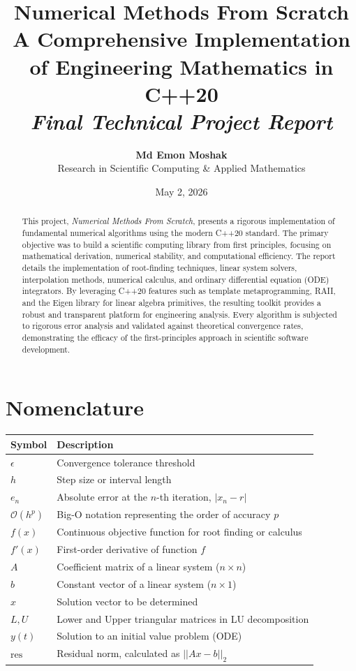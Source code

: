 \documentclass[11pt,a4paper]{article}
\title{
    \vspace{2cm}
    \textbf{\huge Numerical Methods From Scratch} \\
    \vspace{0.5cm}
    \Large A Comprehensive Implementation of Engineering Mathematics in C++20 \\
    \vspace{1cm}
    \large \textit{Final Technical Project Report}
}
\author{
    \textbf{Md Emon Moshak} \\
    \small Research in Scientific Computing & Applied Mathematics
}
\date{May 2, 2026}
\begin{document}
\maketitle
\thispagestyle{empty}

\newpage
\begin{abstract}
This project, \textit{Numerical Methods From Scratch}, presents a rigorous implementation of fundamental numerical algorithms using the modern C++20 standard. The primary objective was to build a scientific computing library from first principles, focusing on mathematical derivation, numerical stability, and computational efficiency. The report details the implementation of root-finding techniques, linear system solvers, interpolation methods, numerical calculus, and ordinary differential equation (ODE) integrators. By leveraging C++20 features such as template metaprogramming, RAII, and the Eigen library for linear algebra primitives, the resulting toolkit provides a robust and transparent platform for engineering analysis. Every algorithm is subjected to rigorous error analysis and validated against theoretical convergence rates, demonstrating the efficacy of the first-principles approach in scientific software development.
\end{abstract}

\newpage
\tableofcontents
\newpage

\section*{Nomenclature}
\begin{table}[h]
\centering
\begin{tabular}{ll}
\toprule
Symbol & Description \\
\midrule
$\epsilon$ & Convergence tolerance threshold \\
$h$ & Step size or interval length \\
$e_n$ & Absolute error at the $n$-th iteration, $|x_n - r|$ \\
$\mathcal{O}(h^p)$ & Big-O notation representing the order of accuracy $p$ \\
$f(x)$ & Continuous objective function for root finding or calculus \\
$f'(x)$ & First-order derivative of function $f$ \\
$A$ & Coefficient matrix of a linear system ($n \times n$) \\
$b$ & Constant vector of a linear system ($n \times 1$) \\
$x$ & Solution vector to be determined \\
$L, U$ & Lower and Upper triangular matrices in LU decomposition \\
$y(t)$ & Solution to an initial value problem (ODE) \\
$\text{res}$ & Residual norm, calculated as $||Ax - b||_2$ \\
\bottomrule
\end{tabular}
\end{table}
\end{document}
